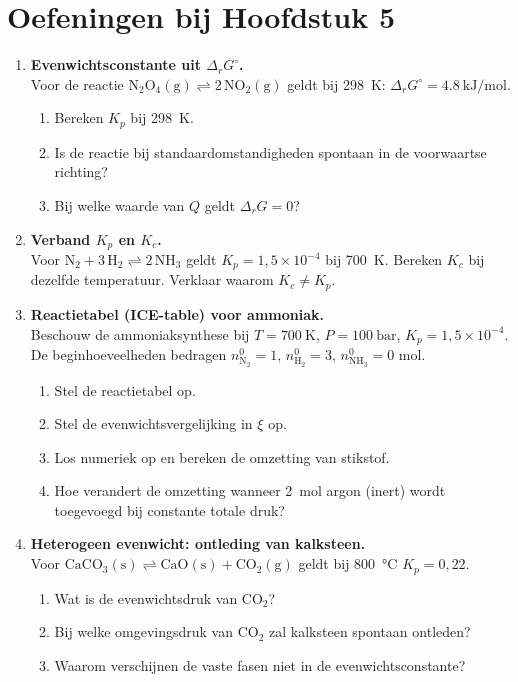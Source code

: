 \section*{Oefeningen bij Hoofdstuk 5}

\begin{enumerate}

\item \textbf{Evenwichtsconstante uit $\Delta_r G^\circ$.} \\
Voor de reactie $\mathrm{N_2O_4(g) \rightleftharpoons 2\,NO_2(g)}$ geldt bij \SI{298}{\kelvin}: $\Delta_r G^\circ = \SI{+4.8}{\kilo\joule\per\mole}$.
\begin{enumerate}
\item[(a)] Bereken $K_p$ bij \SI{298}{\kelvin}.
\item[(b)] Is de reactie bij standaardomstandigheden spontaan in de voorwaartse richting?
\item[(c)] Bij welke waarde van $Q$ geldt $\Delta_r G = 0$?
\end{enumerate}

\item \textbf{Verband $K_p$ en $K_c$.} \\
Voor $\mathrm{N_2 + 3\,H_2 \rightleftharpoons 2\,NH_3}$ geldt $K_p = 1{,}5 \times 10^{-4}$ bij \SI{700}{\kelvin}. Bereken $K_c$ bij dezelfde temperatuur. Verklaar waarom $K_c \neq K_p$.

\item \textbf{Reactietabel (ICE-table) voor ammoniak.} \\
Beschouw de ammoniaksynthese bij $T = \SI{700}{\kelvin}$, $P = \SI{100}{\bar}$, $K_p = 1{,}5 \times 10^{-4}$. De beginhoeveelheden bedragen $n_{\mathrm{N_2}}^0 = 1$, $n_{\mathrm{H_2}}^0 = 3$, $n_{\mathrm{NH_3}}^0 = 0$ mol.
\begin{enumerate}
\item[(a)] Stel de reactietabel op.
\item[(b)] Stel de evenwichtsvergelijking in $\xi$ op.
\item[(c)] Los numeriek op en bereken de omzetting van stikstof.
\item[(d)] Hoe verandert de omzetting wanneer \SI{2}{\mole} argon (inert) wordt toegevoegd bij constante totale druk?
\end{enumerate}

\item \textbf{Heterogeen evenwicht: ontleding van kalksteen.} \\
Voor $\mathrm{CaCO_3(s) \rightleftharpoons CaO(s) + CO_2(g)}$ geldt bij \SI{800}{\celsius} $K_p = 0{,}22$.
\begin{enumerate}
\item[(a)] Wat is de evenwichtsdruk van $\mathrm{CO_2}$?
\item[(b)] Bij welke omgevingsdruk van $\mathrm{CO_2}$ zal kalksteen spontaan ontleden?
\item[(c)] Waarom verschijnen de vaste fasen niet in de evenwichtsconstante?
\end{enumerate}


\end{enumerate}
